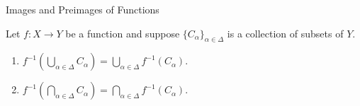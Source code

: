 \begin{section}{Images and Preimages of Functions}
\begin{theorem}\label{thm:unions and intersections of preimages}
Let $f:X\to Y$ be a function and suppose $\{C_{\alpha}\}_{\alpha\in\Delta}$ is a collection of subsets of $Y$.
\begin{enumerate}[label=\textrm{(\alph*)}]
\item $\displaystyle f^{-1}\left(\bigcup_{\alpha\in\Delta} C_{\alpha}\right)=\bigcup_{\alpha\in\Delta} f^{-1}\left(C_{\alpha}\right)$.
\item $\displaystyle f^{-1}\left(\bigcap_{\alpha\in\Delta} C_{\alpha}\right)=\bigcap_{\alpha\in\Delta} f^{-1}\left(C_{\alpha}\right)$.
\end{enumerate}
\end{theorem}

\end{section}